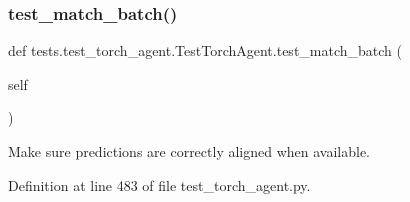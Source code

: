\subsubsection{\texorpdfstring{test\+\_\+match\+\_\+batch()}{test\_match\_batch()}}
{\footnotesize\ttfamily def tests.\+test\+\_\+torch\+\_\+agent.\+Test\+Torch\+Agent.\+test\+\_\+match\+\_\+batch (\begin{DoxyParamCaption}\item[{}]{self }\end{DoxyParamCaption})}

\begin{DoxyVerb}Make sure predictions are correctly aligned when available.
\end{DoxyVerb}
 

Definition at line 483 of file test\+\_\+torch\+\_\+agent.\+py.


